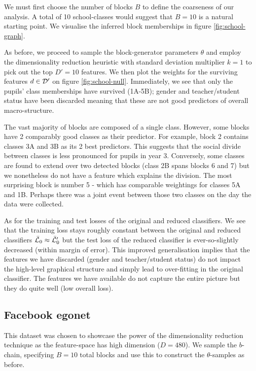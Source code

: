 We must first choose the number of blocks $B$ to define the coarseness of our analysis. A total of 10 school-classes would suggest that $B=10$ is a natural starting point. We visualise the inferred block memberships in figure \ref{fig:school-graph}.

As before, we proceed to sample the block-generator parameters $\theta$ and employ the dimensionality reduction heuristic with standard deviation multiplier $k=1$ to pick out the top $D'=10$ features. We then plot the weights for the surviving features $d \in \mathcal{D}'$ on figure \ref{fig:school-null}. Immediately, we see that only the pupils' class memberships have survived (1A-5B); gender and teacher/student status have been discarded meaning that these are not good predictors of overall macro-structure.

The vast majority of blocks are composed of a single class. However, some blocks have 2 comparably good classes as their predictor. For example, block 2 contains classes 3A and 3B as its 2 best predictors. This suggests that the social divide between classes is less pronounced for pupils in year 3. Conversely, some classes are found to extend over two detected blocks (class 2B spans blocks 6 and 7) but we nonetheless do not have a feature which explains the division. The most surprising block is number 5 - which has comparable weightings for classes 5A and 1B. Perhaps there was a joint event between those two classes on the day the data were collected.

As for the training and test losses of the original and reduced classifiers. We see that the training loss stays roughly constant between the original and reduced classifiers $\bar{\mathcal{L}}_0 \approx \bar{\mathcal{L}}_0'$ but the test loss of the reduced classifier is ever-so-slightly decreased (within margin of error). This improved generalisation implies that the features we have discarded (gender and teacher/student status) do not impact the high-level graphical structure and simply lead to over-fitting in the original classifier. The features we have available do not capture the entire picture but they do quite well (low overall loss).

\subsection{Facebook egonet}

This dataset was chosen to showcase the power of the dimensionality reduction technique as the feature-space has high dimension ($D=480$). We sample the $b$-chain, specifying $B=10$ total blocks and use this to construct the $\theta$-samples as before. 


